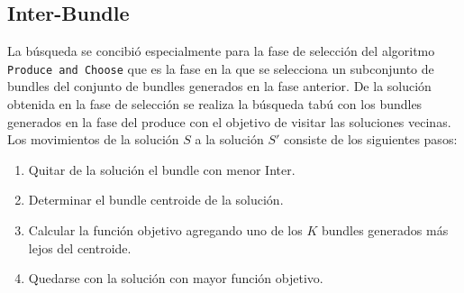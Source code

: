 \subsection{Inter-Bundle}
La búsqueda se concibió especialmente para la fase de selección del algoritmo \texttt{Produce and Choose} que es la fase en la que se selecciona un subconjunto de bundles del conjunto de bundles generados en la fase anterior. De la solución obtenida en la fase de selección se realiza la búsqueda tabú con los bundles generados en la fase del produce con el objetivo de visitar las soluciones vecinas.\\
Los movimientos de la solución $S$ a la solución $S'$ consiste de los siguientes  pasos:
\begin{enumerate}
	\item Quitar de la solución el bundle con menor Inter.
	\item Determinar el bundle centroide de la solución.
	\item Calcular la función objetivo agregando uno de los $K$ bundles generados más lejos del centroide.
	\item Quedarse con la solución con mayor función objetivo. 
\end{enumerate}

